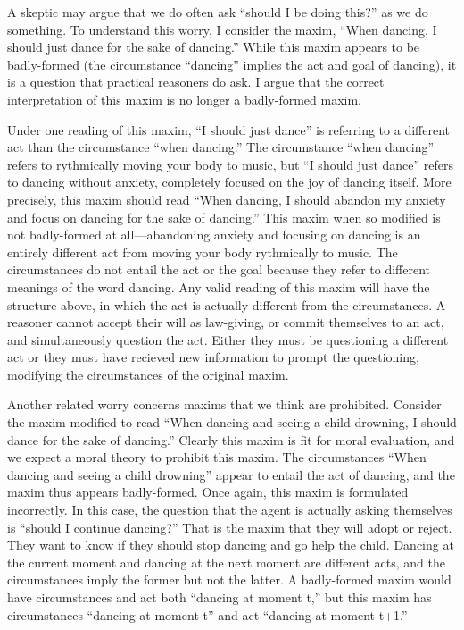 \begin{isabellebody}
\begin{isamarkuptext}
A skeptic may argue that we do often ask ``should I be doing this?'' as we do something. 
To understand this worry, I consider the maxim, 
``When dancing, I should just dance for the sake of dancing.'' While this maxim appears to be badly-formed (the 
circumstance ``dancing'' implies the act and goal of dancing), it is a question that practical reasoners 
do ask. I argue that the correct interpretation of this maxim is no longer a badly-formed maxim.

Under one reading of this maxim, ``I should just dance'' is referring to a different act than the 
circumstance ``when dancing.'' The circumstance ``when dancing'' refers 
to rythmically moving your body to music, but ``I should just dance'' refers to dancing without anxiety, 
completely focused on the joy of dancing itself. More precisely, this maxim should read ``When 
dancing, I should abandon my anxiety and focus on dancing for the sake of dancing.'' This maxim when so 
modified is not badly-formed at all—abandoning anxiety and focusing on dancing is an entirely different act 
from moving your body rythmically to music. The circumstances do not entail the act or the goal because 
they refer to different meanings of the word dancing. Any valid reading of this maxim will have the structure above, 
in which the act is actually different from the circumstances. A reasoner cannot accept their will 
as law-giving, or commit themselves to an act, and simultaneously question the act. Either they must be 
questioning a different act or they must have recieved new information to prompt the questioning, 
modifying the circumstances of the original maxim. 

Another related worry concerns maxims that we think are prohibited. Consider the maxim modified to 
read ``When dancing and seeing a child drowning, I should dance for the sake of dancing.'' Clearly this 
maxim is fit for moral evaluation, and we expect a moral theory to prohibit this maxim. The circumstances 
``When dancing and seeing a child drowning'' appear to entail the act of dancing, and the maxim thus 
appears badly-formed. Once again, this maxim is formulated incorrectly. In this case, the question 
that the agent is actually asking themselves is ``should I continue dancing?'' That is the 
maxim that they will adopt or reject. They want to know if they should stop dancing and go help the child. 
Dancing at the current moment and dancing at the next moment are different acts, and the circumstances 
imply the former but not the latter. A badly-formed maxim would have circumstances and act both 
``dancing at moment t,'' but this maxim has circumstances ``dancing at moment t'' and act ``dancing 
at moment t+1.''


\end{isamarkuptext}
\end{isabellebody}
